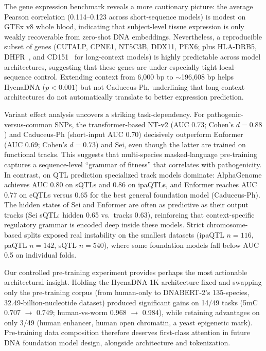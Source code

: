 \documentclass[11pt,a4paper]{article}
\begin{document}
The gene expression benchmark reveals a more cautionary picture: the average Pearson correlation (0.114--0.123 across short-sequence models) is modest on GTEx v8 whole blood, indicating that subject-level tissue expression is only weakly recoverable from zero-shot DNA embeddings. Nevertheless, a reproducible subset of genes (CUTALP, CPNE1, NT5C3B, DDX11, PEX6; plus HLA-DRB5, DHFR~\citep{schweitzer2005dhfr}, and CD151~\citep{hemler2001cd151} for long-context models) is highly predictable across model architectures, suggesting that these genes are under especially tight local-sequence control. Extending context from 6{,}000 bp to $\sim$196{,}608 bp helps HyenaDNA ($p<0.001$) but not Caduceus-Ph, underlining that long-context architectures do not automatically translate to better expression prediction.

Variant effect analysis uncovers a striking task-dependency. For pathogenic-versus-common SNPs, the transformer-based NT-v2 (AUC 0.73; Cohen's $d=0.88$) and Caduceus-Ph (short-input AUC 0.70) decisively outperform Enformer (AUC 0.69; Cohen's $d=0.73$) and Sei, even though the latter are trained on functional tracks. This suggests that multi-species masked-language pre-training captures a sequence-level ``grammar of fitness'' that correlates with pathogenicity. In contrast, on QTL prediction specialized track models dominate: AlphaGenome achieves AUC 0.80 on sQTLs and 0.86 on ipaQTLs, and Enformer reaches AUC 0.77 on eQTLs versus 0.65 for the best general foundation model (Caduceus-Ph). The hidden states of Sei and Enformer are often as predictive as their output tracks (Sei sQTL: hidden 0.65 vs.\ tracks 0.63), reinforcing that context-specific regulatory grammar is encoded deep inside these models. Strict chromosome-based splits exposed real instability on the smallest datasets (ipaQTL $n=116$, paQTL $n=142$, sQTL $n=540$), where some foundation models fall below AUC 0.5 on individual folds.

Our controlled pre-training experiment provides perhaps the most actionable architectural insight. Holding the HyenaDNA-1K architecture fixed and swapping only the pre-training corpus (from human-only to DNABERT-2's 135-species, 32.49-billion-nucleotide dataset) produced significant gains on 14/49 tasks (5mC 0.707 $\rightarrow$ 0.749; human-vs-worm 0.968 $\rightarrow$ 0.984), while retaining advantages on only 3/49 (human enhancer, human open chromatin, a yeast epigenetic mark). Pre-training data composition therefore deserves first-class attention in future DNA foundation model design, alongside architecture and tokenization.
\end{document}

